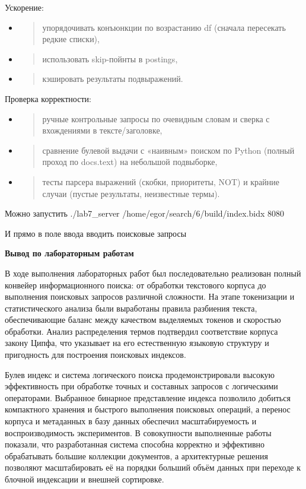 \documentclass[12pt,a4paper]{article}
\begin{document}
Ускорение:

\begin{itemize}
\item
  \begin{quote}
  упорядочивать конъюнкции по возрастанию df (сначала пересекать редкие
  списки),
  \end{quote}
\item
  \begin{quote}
  использовать skip-пойнты в postings,
  \end{quote}
\item
  \begin{quote}
  кэшировать результаты подвыражений.
  \end{quote}
\end{itemize}

Проверка корректности:

\begin{itemize}
\item
  \begin{quote}
  ручные контрольные запросы по очевидным словам и сверка с вхождениями
  в тексте/заголовке,
  \end{quote}
\item
  \begin{quote}
  сравнение булевой выдачи с «наивным» поиском по Python (полный проход
  по docs.text) на небольшой подвыборке,
  \end{quote}
\item
  \begin{quote}
  тесты парсера выражений (скобки, приоритеты, NOT) и крайние случаи
  (пустые результаты, неизвестные термы).
  \end{quote}
\end{itemize}

Можно запустить ./lab7\_server /home/egor/search/6/build/index.bidx 8080

И прямо в поле ввода вводить поисковые запросы

\textbf{Вывод по лабораторным работам}

В ходе выполнения лабораторных работ был последовательно реализован
полный конвейер информационного поиска: от обработки текстового корпуса
до выполнения поисковых запросов различной сложности. На этапе
токенизации и статистического анализа были выработаны правила разбиения
текста, обеспечивающие баланс между качеством выделяемых токенов и
скоростью обработки. Анализ распределения термов подтвердил соответствие
корпуса закону Ципфа, что указывает на его естественную языковую
структуру и пригодность для построения поисковых индексов.

Булев индекс и система логического поиска продемонстрировали высокую
эффективность при обработке точных и составных запросов с логическими
операторами. Выбранное бинарное представление индекса позволило добиться
компактного хранения и быстрого выполнения поисковых операций, а перенос
корпуса и метаданных в базу данных обеспечил масштабируемость и
воспроизводимость экспериментов. В совокупности выполненные работы
показали, что разработанная система способна корректно и эффективно
обрабатывать большие коллекции документов, а архитектурные решения
позволяют масштабировать её на порядки больший объём данных при переходе
к блочной индексации и внешней сортировке.
\end{document}
